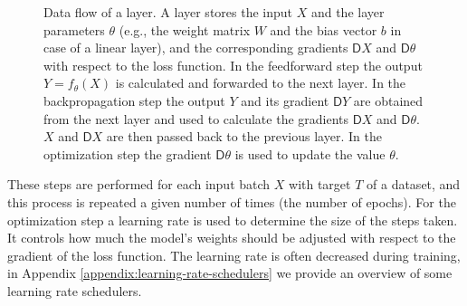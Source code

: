 \documentclass[twoside,11pt]{article}
\newcommand{\const}[1]{\ensuremath{\mathrm{#1}}} %
\newcommand{\Gradient}{\textsf{D}}
\begin{document}
\begin{figure}[t]
    \centering

    \caption{Data flow of a layer. A layer stores the input $X$ and the layer parameters $\theta$ (e.g., the weight matrix $W$ and the bias vector $b$ in case of a linear layer), and the corresponding gradients $\Gradient X$ and $\Gradient \theta$ with respect to the loss function. In the feedforward step the output $Y = f_\theta(X)$ is calculated and forwarded to the next layer. In the backpropagation step the output $Y$ and its gradient $\Gradient Y$ are obtained from the next layer and used to calculate the gradients $\Gradient X$ and $\Gradient \theta$. $X$ and $\Gradient X$ are then passed back to the previous layer. In the optimization step the gradient $\Gradient \theta$ is used to update the value $\theta$.
    }
    \label{fig:layers}
\end{figure}
These steps are performed for each input batch $X$ with target $T$ of a dataset, and this process is repeated a given number of times (the number of epochs). For the optimization step a learning rate \citep{DBLP:conf/bigdataconf/WuLBCIPWYZ19} is used to determine
the size of the steps taken. It controls how much the model's weights should be adjusted with respect to the gradient of the loss function. The learning rate is often decreased during training, in Appendix \ref{appendix:learning-rate-schedulers} we provide an overview of some learning rate schedulers.
\end{document}
